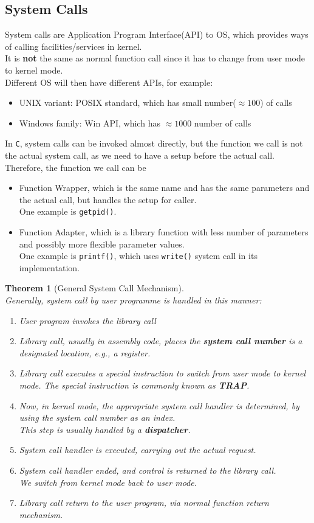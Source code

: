 \documentclass[12pt]{article}
\newtheorem{theorem}{Theorem}[section]
\theoremstyle{definition}
\begin{document}
\subsection{System Calls}
System calls are Application Program Interface(API) to OS, which provides ways of calling facilities/services in kernel.\\It is \textbf{not} the same as normal function call since it has to change from user mode to kernel mode.\\
Different OS will then have different APIs, for example:
\begin{itemize}
  \item UNIX variant: POSIX standard, which has small number($\approx 100$) of calls
  \item Windows family: Win API, which has $\approx 1000$ number of calls
\end{itemize}
In \texttt{C}, system calls can be invoked almost directly, but the function we call is not the actual system call, as we need to have a setup before the actual call. Therefore, the function we call can be
\begin{itemize}
  \item Function Wrapper, which is the same name and has the same parameters and the actual call, but handles the setup for caller. \\One example is \texttt{getpid()}.
  \item Function Adapter, which is a library function with less number of parameters and possibly more flexible parameter values.\\One example is \texttt{printf()}, which uses \texttt{write()} system call in its implementation.
\end{itemize}
\begin{theorem}[General System Call Mechanism]
\hfill\\\normalfont Generally, system call by user programme is handled in this manner:
\begin{enumerate}
  \item User program invokes the library call
  \item Library call, usually in assembly code, places the \textbf{system call number} is a designated location, e.g., a register.
  \item Library call executes a special instruction to switch from user mode to kernel mode. The special instruction is commonly known as \textbf{TRAP}. 
  \item Now, in kernel mode, the appropriate system call handler is determined, by using the system call number as an index. \\This step is usually handled by a \textbf{dispatcher}.
  \item System call handler is executed, carrying out the actual request.
  \item System call handler ended, and control is returned to the library call. \\We switch from kernel mode back to user mode.
  \item Library call return to the user program, via normal function return mechanism.
\end{enumerate}
\end{theorem}
\end{document}

